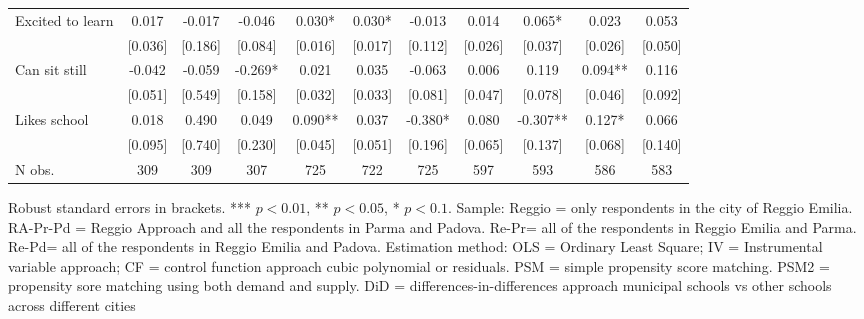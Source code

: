 \documentclass[12pt]{article}
\begin{document}
\begin{table}[ht]
\begin{center}
\begin{adjustbox}{width=1.2\textwidth,center=\textwidth}
\begin{tabular}{l*{10}{c}}
Excited to learn & 0.017 & -0.017 & -0.046 & 0.030* & 0.030* & -0.013 & 0.014 & 0.065* & 0.023 & 0.053 \\
 & [0.036] & [0.186] & [0.084] & [0.016] & [0.017] & [0.112] & [0.026] & [0.037] & [0.026] & [0.050] \\
Can sit still & -0.042 & -0.059 & -0.269* & 0.021 & 0.035 & -0.063 & 0.006 & 0.119 & 0.094** & 0.116 \\
 & [0.051] & [0.549] & [0.158] & [0.032] & [0.033] & [0.081] & [0.047] & [0.078] & [0.046] & [0.092] \\
Likes school & 0.018 & 0.490 & 0.049 & 0.090** & 0.037 & -0.380* & 0.080 & -0.307** & 0.127* & 0.066 \\
 & [0.095] & [0.740] & [0.230] & [0.045] & [0.051] & [0.196] & [0.065] & [0.137] & [0.068] & [0.140] \\

\hline
N obs. &  309 & 309 & 307 & 725 & 722 & 725 & 597 & 593 & 586 & 583 \\

\hline
\end{tabular}
\end{adjustbox}
\end{center}

\begin{footnotesize}
\raggedright{Robust standard errors in brackets. *** $p<0.01$, ** $p<0.05$, * $p<0.1$. Sample: Reggio = only respondents in the city of Reggio Emilia. RA-Pr-Pd = Reggio Approach and all the respondents in Parma and Padova. Re-Pr= all of the respondents in Reggio Emilia and Parma. Re-Pd= all of the respondents in Reggio Emilia and Padova. Estimation method: OLS = Ordinary Least Square; IV = Instrumental variable approach; CF = control function approach cubic polynomial or residuals. PSM = simple propensity score matching. PSM2 = propensity sore matching using both demand and supply. DiD = differences-in-differences approach municipal schools vs other schools across different cities}
\end{footnotesize}
\end{table}
\end{document}
